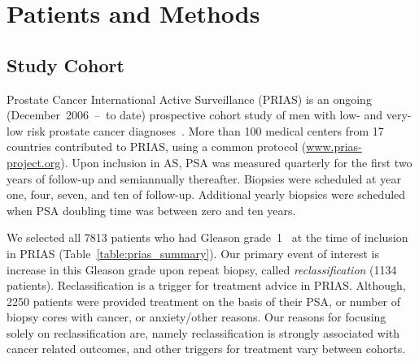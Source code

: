 \section{Patients and Methods}

\subsection{Study Cohort}
\label{subsec:cohort}
Prostate Cancer International Active Surveillance (PRIAS) is an ongoing (December~2006~--~to date) prospective cohort study of men with low- and very-low risk prostate cancer diagnoses~\citep{bul2013active}. More than 100 medical centers from 17 countries contributed to PRIAS, using a common protocol (\url{www.prias-project.org}). Upon inclusion in AS, PSA was measured quarterly for the first two years of follow-up and semiannually thereafter. Biopsies were scheduled at year one, four, seven, and ten of follow-up. Additional yearly biopsies were scheduled when PSA doubling time was between zero and ten years.

We selected all 7813 patients who had Gleason grade~1~\citep{epsteinGG2014} at the time of inclusion in PRIAS (Table~\ref{table:prias_summary}). Our primary event of interest is increase in this Gleason grade upon repeat biopsy, called \textit{reclassification} (1134 patients). Reclassification is a trigger for treatment advice in PRIAS. Although, 2250 patients were provided treatment on the basis of their PSA, or number of biopsy cores with cancer, or anxiety/other reasons. Our reasons for focusing solely on reclassification are, namely reclassification is strongly associated with cancer related outcomes, and other triggers for treatment vary between cohorts.

